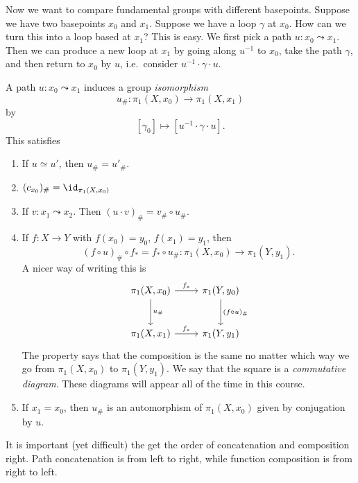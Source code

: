 \documentclass[a4paper]{article}
\begin{document}
Now we want to compare fundamental groups with different basepoints. Suppose we have two basepoints $x_0$ and $x_1$. Suppose we have a loop $\gamma$ at $x_0$. How can we turn this into a loop based at $x_1$? This is easy. We first pick a path $u: x_0 \leadsto x_1$. Then we can produce a new loop at $x_1$ by going along $u^{-1}$ to $x_0$, take the path $\gamma$, and then return to $x_0$ by $u$, i.e.\ consider $u^{-1}\cdot \gamma\cdot u$.
\begin{center}
\end{center}

\begin{prop}
  A path $u: x_0 \leadsto x_1$ induces a group \emph{isomorphism}
  \[
    u_\#: \pi_1(X, x_0) \to \pi_1(X, x_1)
  \]
  by
  \[
    [\gamma_0] \mapsto [u^{-1}\cdot \gamma \cdot u].
  \]
  This satisfies
  \begin{enumerate}
    \item If $u\simeq u'$, then $u_\# = u'_\#$.
    \item $(c_{x_0})_\# = \id_{\pi_1(X, x_0)}$
    \item If $v: x_1 \leadsto x_2$. Then $(u\cdot v)_\# = v_\# \circ u_\#$.
    \item If $f: X\to Y$ with $f(x_0) = y_0$, $f(x_1) = y_1$, then
      \[
        (f\circ u)_\# \circ f_* = f_* \circ u_\#: \pi_1(X, x_0) \to \pi_1(Y, y_1).
      \]
      A nicer way of writing this is
      \[
        \begin{tikzcd}[row sep=large]
          \pi_1(X, x_0) \ar[r, "f_*"] \ar[d, "u_\#"] & \pi_1(Y, y_0)\ar [d, "(f\circ u)_\#"]\\
          \pi_1(X, x_1) \ar[r, "f_*"] & \pi_1(Y, y_1)
        \end{tikzcd}
      \]
      The property says that the composition is the same no matter which way we go from $\pi_1(X, x_0)$ to $\pi_1(Y, y_1)$. We say that the square is a \emph{commutative diagram}. These diagrams will appear all of the time in this course.
    \item If $x_1 = x_0$, then $u_\#$ is an automorphism of $\pi_1(X, x_0)$ given by conjugation by $u$.
  \end{enumerate}
\end{prop}
It is important (yet difficult) the get the order of concatenation and composition right. Path concatenation is from left to right, while function composition is from right to left.
\end{document}
